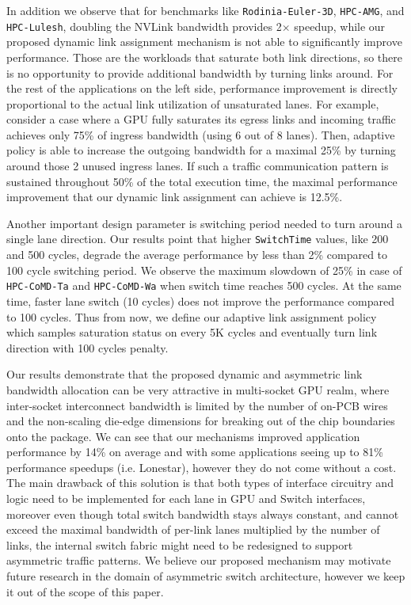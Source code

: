 In addition we observe that for benchmarks like \texttt{Rodinia-Euler-3D}, \texttt{HPC-AMG}, and 
\texttt{HPC-Lulesh}, doubling the NVLink bandwidth provides 2$\times$ 
speedup, while our proposed dynamic link assignment mechanism is not 
able to significantly improve performance. Those are the workloads 
that saturate both link directions, so there is no opportunity to 
provide additional bandwidth by turning links around. For the rest of 
the applications on the left side, performance improvement is directly 
proportional to the actual link utilization of unsaturated lanes. For 
example, consider a case where a GPU fully saturates its egress links 
and incoming traffic achieves only 75\% of ingress bandwidth (using 6 
out of 8 lanes). Then, adaptive policy is able to increase the outgoing 
bandwidth for a maximal 25\% by turning around those 2 unused ingress 
lanes. If such a traffic communication pattern is sustained throughout 
50\% of the total execution time, the maximal performance improvement 
that our dynamic link assignment can achieve is 12.5\%.

Another important design parameter is switching period needed to turn around a
single lane direction. Our results point that higher \texttt{SwitchTime}
values, like 200 and 500 cycles, degrade the average performance by less than
2\% compared to 100 cycle switching period. We observe the maximum slowdown of
25\% in case of \texttt{HPC-CoMD-Ta} and \texttt{HPC-CoMD-Wa} when switch time
reaches 500 cycles. At the same time, faster lane switch (10 cycles) does not
improve the performance compared to 100 cycles. Thus from now, we define our
adaptive link assignment policy which samples saturation status on every 5K
cycles and eventually turn link direction with 100 cycles penalty.

Our results demonstrate that the proposed dynamic and asymmetric link
bandwidth allocation can be very attractive in multi-socket GPU realm, where
inter-socket interconnect bandwidth is limited by the number of on-PCB wires
and the non-scaling die-edge dimensions for breaking out of the chip boundaries
onto the package. We can see that our mechanisms improved application
performance by 14\% on average and with some applications seeing up to 81\%
performance speedups (i.e. Lonestar), however they do not come without a cost.
The main drawback of this solution is that both types of interface circuitry
and logic need to be implemented for each lane in GPU and Switch interfaces, moreover
even though total switch bandwidth stays always constant, and cannot exceed the 
maximal bandwidth of per-link lanes multiplied by the number of links, 
the internal switch fabric might need to be redesigned to support
asymmetric traffic patterns. We believe our proposed mechanism may motivate
future research in the domain of asymmetric switch architecture, however we
keep it out of the scope of this paper.

